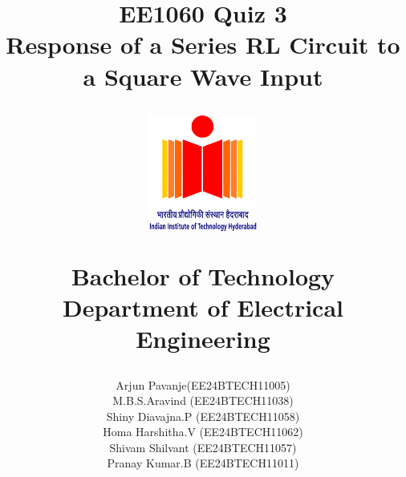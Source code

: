 \documentclass[12pt,a4paper]{report}
\begin{document}
\title{\textbf{EE1060 Quiz 3}\\
\LARGE{\textbf{Response of a Series RL Circuit to a Square Wave Input}}

\author{ Arjun Pavanje(EE24BTECH11005)\\M.B.S.Aravind (EE24BTECH11038)\\Shiny Diavajna.P (EE24BTECH11058)\\Homa Harshitha.V (EE24BTECH11062)\\Shivam Shilvant (EE24BTECH11057)\\Pranay Kumar.B (EE24BTECH11011)}

\begin{center}
\end{center}
\vspace{30pt}
\begin{figure}[ht]
	\centering
	\includegraphics[width = 100pt]{.logo/logo.png}\\
\end{figure}
\begin{center}
	Bachelor of Technology\\
	\vspace{10pt}
	Department of Electrical Engineering\\
\end{center}
}
\maketitle
\end{document}
